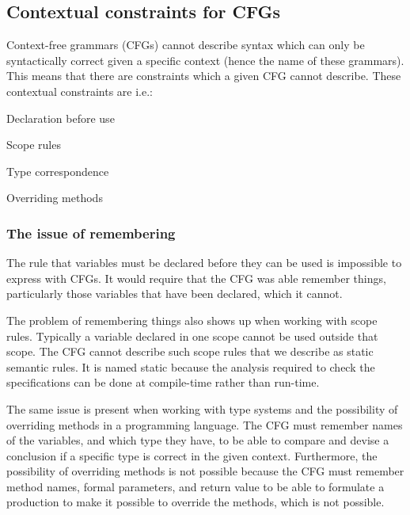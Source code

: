 \subsection{Contextual constraints for CFGs}
\label{sec:contextualconstraints}

Context-free grammars (CFGs) cannot describe syntax which can only be
syntactically correct given a specific context (hence the name of these
grammars). This means that there are constraints which a given CFG cannot
describe.
These contextual constraints are i.e.:
\cite[p. 39]{plpp}

\begin{dlist}
\item Declaration before use
\item Scope rules
\item Type correspondence
\item Overriding methods
\end{dlist}


\subsubsection{The issue of remembering}

The rule that variables must be declared before they can be used is impossible
to express with CFGs. It would require that the CFG was able remember things,
particularly those variables that have been declared, which it cannot. 

The problem of remembering things also shows up when working with scope rules.
Typically a variable declared in one scope cannot be used outside that scope.
The CFG cannot describe such scope rules that we describe as static semantic
rules. It is named static because the analysis required to check the
specifications can be done at compile-time rather than run-time.
\cite[p. 153]{sebesta2013}

The same issue is present when working with type systems and the possibility of
overriding methods in a programming language. The CFG must remember names of the
variables, and which type they have, to be able to compare and devise a conclusion
if a specific type is correct in the given context. Furthermore, the possibility
of overriding methods is not possible because the CFG must remember method
names, formal parameters, and return value to be able to formulate a production
to make it possible to override the methods, which is not possible.

